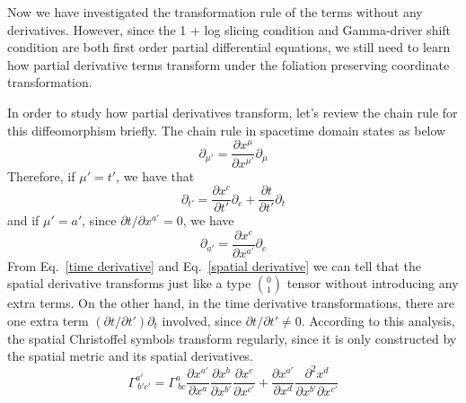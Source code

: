 \documentclass[letterpaper,nofootinbib,prd,amsmath,onecolumn]{revtex4-1}
\begin{document}
Now we have investigated the transformation rule of the terms without any derivatives. However, since the 1 + log slicing condition and Gamma-driver shift condition are both first order partial differential equations, we still need to learn how partial derivative terms transform under the foliation preserving coordinate transformation. 

In order to study how partial derivatives transform, let's review the chain rule for this diffeomorphism briefly. The chain rule in spacetime domain states as below
\begin{equation*}
\partial_{\mu'} = \frac{\partial x^{\mu}}{\partial x^{\mu'}}\partial_{\mu}
\end{equation*}
Therefore, if $\mu' = t'$, we have that
\begin{equation}\label{time derivative}
\partial_{t'} = \frac{\partial x^{c}}{\partial t'}\partial_{c} + \frac{\partial t}{\partial t'}\partial_{t}
\end{equation}
and if $\mu' = a'$, since $\partial t/\partial x^{a'} = 0$, we have
\begin{equation}\label{spatial derivative}
\partial_{a'} = \frac{\partial x^{c}}{\partial x^{a'}}\partial_{c}
\end{equation}
From Eq.~\ref{time derivative} and Eq.~\ref{spatial derivative} we can tell that the spatial derivative transforms just like a type $0 \choose 1$ tensor without introducing any extra terms. On the other hand, in the time derivative transformations, there are one extra term $(\partial t/\partial t')\partial_{t}$ involved, since $\partial t/\partial t' \ne 0$. According to this analysis, the spatial Christoffel symbols transform regularly, since it is only constructed by the spatial metric and its spatial derivatives. 
\begin{equation}
\Gamma^{a'}_{~b'c'} = \Gamma^{a}_{~bc}\frac{\partial x^{a'}}{\partial x^{a}}\frac{\partial x^{b}}{\partial x^{b'}}\frac{\partial x^{c}}{\partial x^{c'}} + \frac{\partial x^{a'}}{\partial x^{d}}\frac{\partial^{2} x^{d}}{\partial x^{b'}\partial x^{c'}}
\end{equation}
\end{document}
